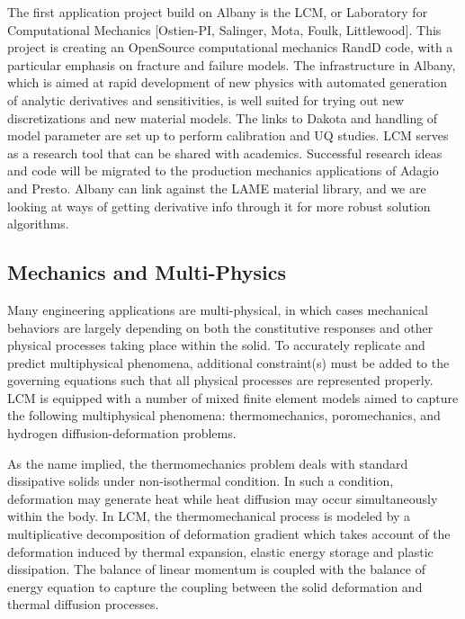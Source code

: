 \documentclass[pdf,12pt,report,strict]{SANDreport}
\theoremstyle{remark}
\begin{document}
The first application project build on Albany is the LCM, or
Laboratory for Computational Mechanics [Ostien-PI, Salinger, Mota,
  Foulk, Littlewood]. This project is creating an OpenSource
computational mechanics RandD code, with a particular emphasis on
fracture and failure models. The infrastructure in Albany, which is
aimed at rapid development of new physics with automated generation of
analytic derivatives and sensitivities, is well suited for trying out
new discretizations and new material models. The links to Dakota and
handling of model parameter are set up to perform calibration and UQ
studies. LCM serves as a research tool that can be shared with
academics. Successful research ideas and code will be migrated to the
production mechanics applications of Adagio and Presto. Albany can
link against the LAME material library, and we are looking at ways of
getting derivative info through it for more robust solution
algorithms.  


\subsection{Mechanics and Multi-Physics}
Many engineering applications are multi-physical, in which cases 
mechanical behaviors are largely depending on both 
the constitutive responses and other physical processes taking 
place within the solid. To accurately replicate and predict multiphysical 
phenomena, additional constraint(s) must be added to the governing equations
 such that all physical processes are represented properly. 
LCM is equipped with a number of mixed finite element models aimed to capture
the following multiphysical phenomena: thermomechanics, poromechanics, and hydrogen diffusion-deformation problems. 

As the name implied, the thermomechanics problem deals with standard dissipative
 solids under non-isothermal condition. In such a condition, deformation may
  generate heat while heat diffusion may occur simultaneously within the body. 
In LCM, the thermomechanical process is modeled by a multiplicative decomposition 
of deformation gradient which takes account of the deformation induced by thermal
 expansion, elastic energy storage and plastic dissipation. The balance of 
linear momentum is coupled with the balance of energy equation to capture the
 coupling between the solid deformation and thermal diffusion processes. 
\end{document}
